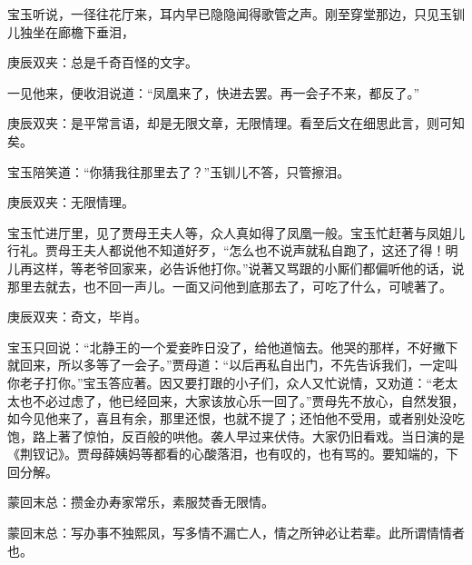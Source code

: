 \begin{parag}
    宝玉听说，一径往花厅来，耳内早已隐隐闻得歌管之声。刚至穿堂那边，只见玉钏儿独坐在廊檐下垂泪，\begin{note}庚辰双夹：总是千奇百怪的文字。\end{note}一见他来，便收泪说道：“凤凰来了，快进去罢。再一会子不来，都反了。”\begin{note}庚辰双夹：是平常言语，却是无限文章，无限情理。看至后文在细思此言，则可知矣。\end{note}宝玉陪笑道：“你猜我往那里去了？”玉钏儿不答，只管擦泪。\begin{note}庚辰双夹：无限情理。\end{note}宝玉忙进厅里，见了贾母王夫人等，众人真如得了凤凰一般。宝玉忙赶著与凤姐儿行礼。贾母王夫人都说他不知道好歹，“怎么也不说声就私自跑了，这还了得！明儿再这样，等老爷回家来，必告诉他打你。”说著又骂跟的小厮们都偏听他的话，说那里去就去，也不回一声儿。一面又问他到底那去了，可吃了什么，可唬著了。\begin{note}庚辰双夹：奇文，毕肖。\end{note}宝玉只回说：“北静王的一个爱妾昨日没了，给他道恼去。他哭的那样，不好撇下就回来，所以多等了一会子。”贾母道：“以后再私自出门，不先告诉我们，一定叫你老子打你。”宝玉答应著。因又要打跟的小子们，众人又忙说情，又劝道：“老太太也不必过虑了，他已经回来，大家该放心乐一回了。”贾母先不放心，自然发狠，如今见他来了，喜且有余，那里还恨，也就不提了；还怕他不受用，或者别处没吃饱，路上著了惊怕，反百般的哄他。袭人早过来伏侍。大家仍旧看戏。当日演的是《荆钗记》。贾母薛姨妈等都看的心酸落泪，也有叹的，也有骂的。要知端的，下回分解。
\end{parag}


\begin{parag}
    \begin{note}蒙回末总：攒金办寿家常乐，素服焚香无限情。\end{note}
\end{parag}


\begin{parag}
    \begin{note}蒙回末总：写办事不独熙凤，写多情不漏亡人，情之所钟必让若辈。此所谓情情者也。\end{note}
\end{parag}

